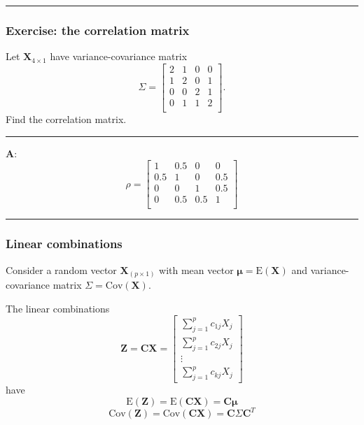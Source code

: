 \documentclass[]{article}
\begin{document}
\begin{center}\rule{0.5\linewidth}{\linethickness}\end{center}

\hypertarget{exercise-the-correlation-matrix}{%
\subsubsection{Exercise: the correlation
matrix}\label{exercise-the-correlation-matrix}}

Let \(\mathbf{X}_{4\times 1}\) have variance-covariance matrix
\[\Sigma= \left[ \begin{array}{cccc} 2&1&0&0\\
      1&2&0&1\\
      0&0&2&1\\
      0&1&1&2\\
          \end{array}
          \right].\] Find the correlation matrix.

\begin{center}\rule{0.5\linewidth}{\linethickness}\end{center}

\textbf{A}: \[\rho=\left[ \begin{array}{cccc} 1&0.5&0&0\\
      0.5&1&0&0.5\\
      0&0&1&0.5\\
      0&0.5&0.5&1\\
          \end{array}
          \right]\]

\begin{center}\rule{0.5\linewidth}{\linethickness}\end{center}

\hypertarget{linear-combinations}{%
\subsubsection{Linear combinations}\label{linear-combinations}}

Consider a random vector \(\mathbf{X}_{(p\times 1)}\) with mean vector
\(\mathbf{\mu}=\text{E}(\mathbf{X})\) and variance-covariance matrix
\(\Sigma=\text{Cov}(\mathbf{X})\).

The linear combinations
\[\mathbf{Z}=\mathbf{C}\mathbf{X}=\left[ \begin{array}{c} \sum_{j=1}^p c_{1j}X_j\\ \sum_{j=1}^p c_{2j}X_j\\ \vdots \\ \sum_{j=1}^p c_{kj}X_j \end{array} \right]\]
have
\[\text{E}(\mathbf{Z})=\text{E}(\mathbf{C}\mathbf{X})=\mathbf{C}\mathbf{\mu}\]
\[\text{Cov}(\mathbf{Z})=\text{Cov}(\mathbf{C}\mathbf{X})=
   \mathbf{C}\Sigma\mathbf{C}^T\]
\end{document}
